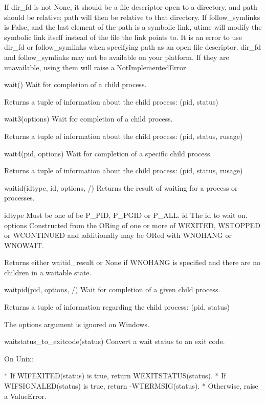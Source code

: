 \documentclass{article}
\begin{document}
        If dir_fd is not None, it should be a file descriptor open to a directory,
          and path should be relative; path will then be relative to that directory.
        If follow_symlinks is False, and the last element of the path is a symbolic
          link, utime will modify the symbolic link itself instead of the file the
          link points to.
        It is an error to use dir_fd or follow_symlinks when specifying path
          as an open file descriptor.
        dir_fd and follow_symlinks may not be available on your platform.
          If they are unavailable, using them will raise a NotImplementedError.

    wait()
        Wait for completion of a child process.

        Returns a tuple of information about the child process:
            (pid, status)

    wait3(options)
        Wait for completion of a child process.

        Returns a tuple of information about the child process:
          (pid, status, rusage)

    wait4(pid, options)
        Wait for completion of a specific child process.

        Returns a tuple of information about the child process:
          (pid, status, rusage)

    waitid(idtype, id, options, /)
        Returns the result of waiting for a process or processes.

          idtype
            Must be one of be P_PID, P_PGID or P_ALL.
          id
            The id to wait on.
          options
            Constructed from the ORing of one or more of WEXITED, WSTOPPED
            or WCONTINUED and additionally may be ORed with WNOHANG or WNOWAIT.

        Returns either waitid_result or None if WNOHANG is specified and there are
        no children in a waitable state.

    waitpid(pid, options, /)
        Wait for completion of a given child process.

        Returns a tuple of information regarding the child process:
            (pid, status)

        The options argument is ignored on Windows.

    waitstatus_to_exitcode(status)
        Convert a wait status to an exit code.

        On Unix:

        * If WIFEXITED(status) is true, return WEXITSTATUS(status).
        * If WIFSIGNALED(status) is true, return -WTERMSIG(status).
        * Otherwise, raise a ValueError.
\end{document}
